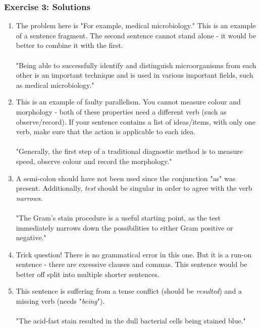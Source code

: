 \documentclass{article}
\begin{document}
\newpage 
\subsubsection*{Exercise 3: Solutions}

\begin{enumerate}
\item The problem here is "For example, medical microbiology." This is an example of a sentence fragment. The second sentence cannot stand alone - it would be better to combine it with the first.
\paragraph{} "Being able to successfully identify and distinguish microorganisms from each other is an important technique and is used in various important fields, such as medical microbiology."

\item This is an example of faulty parallelism. You cannot measure colour and morphology - both of these properties need a different verb (such as observe/record). If your sentence contains a list of ideas/items, with only one verb, make sure that the action is applicable to each idea. 
\paragraph{} "Generally, the first step of a traditional diagnostic method is to measure speed, observe colour and record the morphology."

\item A semi-colon should have not been used since the conjunction "as" was present. Additionally, \textit{test} should be singular in order to agree with the verb \textit{narrows}.
\paragraph{} "The Gram’s stain procedure is a useful starting point, as the test immediately narrows down the possibilities to either Gram positive or negative."

\item Trick question! There is no grammatical error in this one. But it is a run-on sentence - there are excessive clauses and commas. This sentence would be better off split into multiple shorter sentences.
\item This sentence is suffering from a tense conflict (should be \textit{resulted}) and a missing verb (needs "\textit{being}").
\paragraph{} "The acid-fast stain resulted in the dull bacterial cells being stained blue." 
\end{enumerate}
\end{document}
